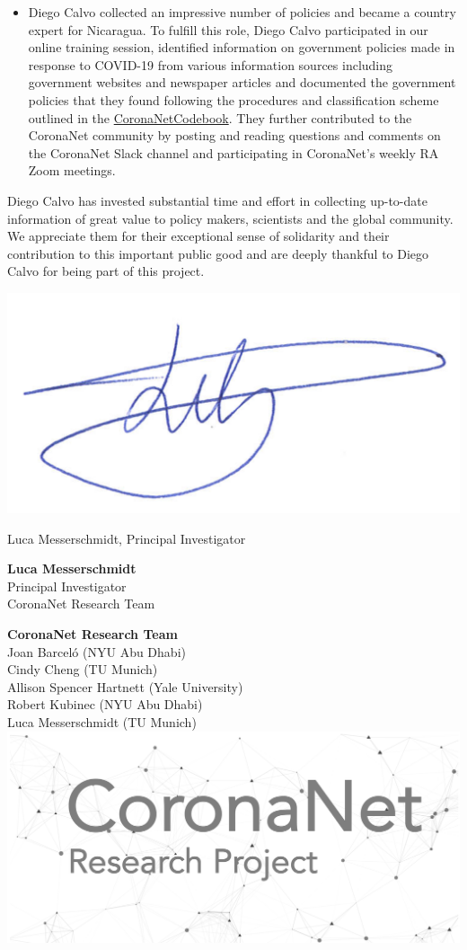 \documentclass[
]{article}
\providecommand{\tightlist}{%
  \setlength{\itemsep}{0pt}\setlength{\parskip}{0pt}}
\begin{document}
\begin{itemize}
\tightlist
\item
  Diego Calvo collected an impressive number of policies and became a
  country expert for Nicaragua. To fulfill this role, Diego Calvo
  participated in our online training session, identified information on
  government policies made in response to COVID-19 from various
  information sources including government websites and newspaper
  articles and documented the government policies that they found
  following the procedures and classification scheme outlined in the
  \href{https://docs.google.com/document/d/1zvNMpwj0onFvUZ_gLl4RRjqS-clbHv3TIX6EOHofsME/edit?usp=sharing}{CoronaNetCodebook}.
  They further contributed to the CoronaNet community by posting and
  reading questions and comments on the CoronaNet Slack channel and
  participating in CoronaNet's weekly RA Zoom meetings.
\end{itemize}

Diego Calvo has invested substantial time and effort in collecting
up-to-date information of great value to policy makers, scientists and
the global community. We appreciate them for their exceptional sense of
solidarity and their contribution to this important public good and are
deeply thankful to Diego Calvo for being part of this project.

\vspace{1cm}

\includegraphics[width=0.2\linewidth]{unterschrift_LM}

Luca Messerschmidt, Principal Investigator

\fontsize{12}{4}\selectfont
\vspace{0.3cm}
\setlength{\baselineskip}{0.5cm}

\textbf{Luca Messerschmidt}\\
Principal Investigator\\
CoronaNet Research Team

\vspace{0.1cm}

\textbf{CoronaNet Research Team}\\
Joan Barceló (NYU Abu Dhabi)\\
Cindy Cheng (TU Munich)\\
Allison Spencer Hartnett (Yale University)\\
Robert Kubinec (NYU Abu Dhabi)\\
Luca Messerschmidt (TU Munich)\\

\includegraphics[width=0.4\linewidth]{logo_wide}
\end{document}
